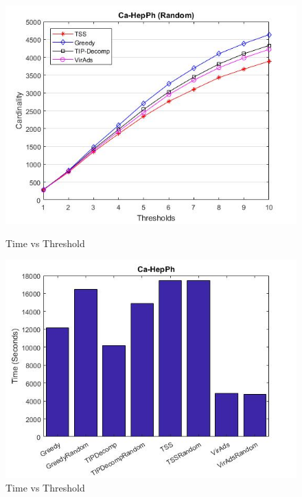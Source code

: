 \begin{figure}[h!]
\begin{minipage}[t]{0.50\textwidth}
\includegraphics[width=\linewidth,keepaspectratio=true]{images/ca-hepphresultrandom.jpg}
\caption{Time vs Threshold}

\end{minipage}
\begin{minipage}[t]{0.50\textwidth}
\includegraphics[width=\linewidth,keepaspectratio=true]{images/hepphtime.jpg}
\caption{Time vs Threshold}
\end{minipage}
\end{figure}

